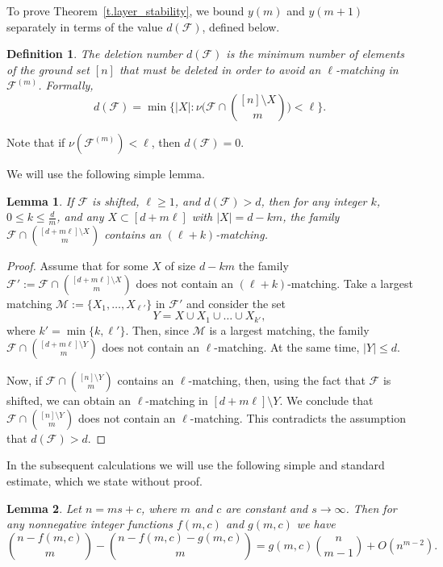 \documentclass[12pt,a4paper]{article}
\newtheorem{mydef}{Definition}
\newtheorem{lemma}{Lemma}
\begin{document}
To prove Theorem~\ref{t.layer_stability}, we bound $y(m)$ and $y(m+1)$ separately in terms of the value $d(\mathcal{F})$, defined below.

\begin{mydef}
    The \textit{deletion number} $d(\mathcal{F})$ is the minimum number of elements of the ground set $[n]$ that must be deleted in order to avoid an $\ell$-matching in $\mathcal{F}^{(m)}$. Formally,
    \[
    d(\mathcal{F}) = \min\Big\{|X| : \nu\Big(\mathcal{F} \cap {[n] \setminus X \choose m}\Big) < \ell\Big\}.
    \]
\end{mydef}

Note that if $\nu(\mathcal{F}^{(m)}) < \ell$, then $d(\mathcal{F}) = 0$.

We will use the following simple lemma.

\begin{lemma} \label{l.deleteon_with_shifting}
    If $\mathcal{F}$ is shifted, $\ell \geq 1$, and $d(\mathcal{F}) > d$, then for any integer $k$, $0 \leq k \leq \frac{d}{m}$, and any $X \subset [d + m\ell]$ with $|X| = d - km$, the family $\mathcal{F} \cap {[d+m\ell] \setminus X \choose m}$ contains an $(\ell+k)$-matching.
\end{lemma}

\begin{proof}
Assume that for some $X$ of size $d-km$ the family $\mathcal{F}':=\mathcal{F}\cap {[d+m\ell]\setminus X\choose m}$ does not contain an $(\ell+k)$-matching. Take a largest matching $\mathcal{M}:=\{X_1,\ldots, X_{\ell'}\}$ in $\mathcal{F}'$ and consider the set
\[
Y = X\cup X_1\cup\ldots\cup X_{k'},
\]
where $k' = \min \{k,\ell'\}$. Then, since $\mathcal{M}$ is a largest matching, the family $\mathcal{F}\cap {[d+m\ell]\setminus Y\choose m}$ does not contain an $\ell$-matching. At the same time, $|Y| \le d$.

Now, if $\mathcal{F}\cap {[n]\setminus Y\choose m}$ contains an $\ell$-matching, then, using the fact that $\mathcal{F}$ is shifted, we can obtain an $\ell$-matching in $[d+m\ell]\setminus Y$. We conclude that $\mathcal{F}\cap {[n]\setminus Y\choose m}$ does not contain an $\ell$-matching. This contradicts the assumption that $d(\mathcal{F})>d$.
\end{proof}

In the subsequent calculations we will use the following simple and standard estimate, which we state without proof.

\begin{lemma} \label{l.binom_asymp}
    Let $n = ms + c$, where $m$ and $c$ are constant and $s \rightarrow \infty$. Then for any nonnegative integer functions $f(m, c)$ and $g(m, c)$ we have
    \[
    {n - f(m, c) \choose m} - {n - f(m, c) - g(m, c) \choose m}
    = g(m,c){n \choose m - 1} + O(n^{m-2}).
    \]
\end{lemma}
\end{document}
